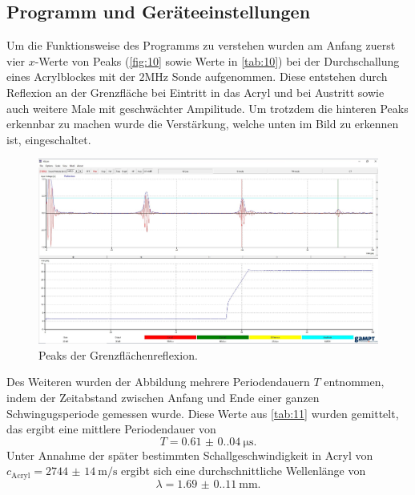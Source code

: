 \subsection{Programm und Geräteeinstellungen}
Um die Funktionsweise des Programms zu verstehen wurden am Anfang 
zuerst vier $x$-Werte von Peaks (\autoref{fig:10} sowie Werte in \autoref{tab:10})
bei der Durchschallung eines Acrylblockes mit der $2 \unit{\mega\hertz}$ Sonde
aufgenommen. Diese entstehen durch Reflexion an der Grenzfläche bei Eintritt in
das Acryl und bei Austritt sowie auch weitere Male mit geschwächter Ampilitude.
Um trotzdem die hinteren Peaks erkennbar zu machen wurde die Verstärkung,
welche unten im Bild zu erkennen ist, eingeschaltet.
\begin{figure}[H]
    \centering
    \caption{Peaks der Grenzflächenreflexion.}
    \label{fig:10}
    \includegraphics[width=\textwidth]{bilder/ssprogramm.jpg}
\end{figure}
\noindent Des Weiteren wurden der Abbildung mehrere Periodendauern $T$ entnommen, indem 
der Zeitabstand zwischen Anfang und Ende einer ganzen Schwingugsperiode 
gemessen wurde. Diese Werte aus \autoref{tab:11} wurden gemittelt, das
ergibt eine mittlere Periodendauer von 
\begin{equation}
   T = \qty{0.61(0.04)}{\micro\second}.
\end{equation}
Unter Annahme der später bestimmten Schallgeschwindigkeit in Acryl von
$c_\text{Acryl} = \qty{2744(14)}{\meter\per\second}$ ergibt sich eine
durchschnittliche Wellenlänge von
\begin{equation}
   \lambda = \qty{1.69(0.11)}{\milli\meter}.
\end{equation}

